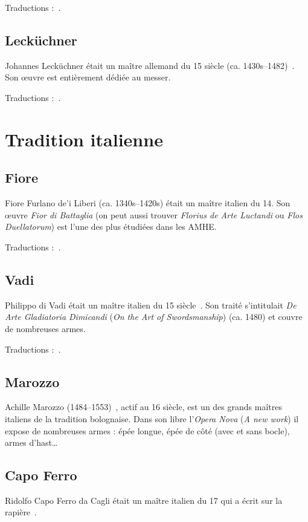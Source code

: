 Traductions :~\cite{gaurin:talhoffer:2005}.


\subsection{Lecküchner}
\label{app:maitres:lekuchner}

Johannes Lecküchner était un maître allemand du 15\ieme{} siècle (ca. 1430s–1482)~\cite{wiktenauer:leckuchner}.
Son œuvre est entièrement dédiée au messer.


Traductions :~\cite{ardamhe:leckuchner}.


\section{Tradition italienne}



\subsection{Fiore}
\label{app:maitres:fiore}

Fiore Furlano de'i Liberi (ca. 1340s–1420s) était un maître italien du 14\ieme{}.
Son œuvre \emph{Fior di Battaglia} (on peut aussi trouver \emph{Florius de Arte Luctandi} ou \emph{Flos Duellatorum}) est l'une des plus étudiées dans les AMHE.

Traductions :~\cite{conan:fiore, exiles:fiore:getty}.


\subsection{Vadi}
\label{app:maitres:vadi}

Philippo di Vadi était un maître italien du 15\ieme{} siècle~\cite{wiktenauer:vadi}.
Son traité s'intitulait \emph{De Arte Gladiatoria Dimicandi} (\emph{On the Art of Swordsmanship}) (ca. 1480) et couvre de nombreuses armes.

Traductions :~\cite{chaize:vadi, patrouix:vadi:2013, petit:vadi:longword}.


\subsection{Marozzo}
\label{app:maitres:marozzo}

Achille Marozzo (1484–1553)~\cite{wiktenauer:marozzo}, actif au 16\ieme{} siècle, est un des grands maîtres italiens de la tradition bolognaise.
Dans son libre l'\emph{Opera Nova} (\emph{A new work}) il expose de nombreuses armes : épée longue, épée de côté (avec et sans bocle), armes d'hast…


\subsection{Capo Ferro}
\label{app:maitres:capo_ferro}

Ridolfo Capo Ferro da Cagli était un maître italien du 17\ieme{} qui a écrit sur la rapière~\cite{wiktenauer:capo_ferro}.
